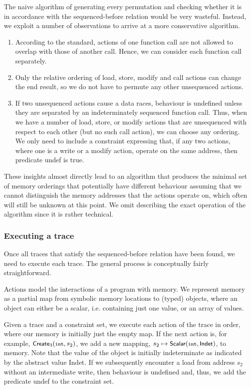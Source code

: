 \documentclass[a4paper,12pt]{scrbook}
\theoremstyle{plain}
\theoremstyle{definition}
\newcommand{\sem}[1]{{\small{\textsf{#1}}}}
\newcommand{\cc}[1]{{\text{\footnotesize\ttfamily{#1}}}}
\begin{document}
The naive algorithm of generating every permutation and checking whether it is
in accordance with the sequenced-before relation would be very
wasteful. Instead, we exploit a number of observations to arrive at a more
conservative algorithm.
\begin{enumerate}
\item According to the standard, actions of one function call are not allowed to
  overlap with those of another call. Hence, we can consider each function call
  separately.
\item Only the relative ordering of load, store, modify and call actions can
  change the end result, so we do not have to permute any other unsequenced
  actions.
\item If two unsequenced actions cause a data races, behaviour is undefined
  unless they are separated by an indeterminately sequenced function call. Thus,
  when we have a number of load, store, or modify actions that are unsequenced
  with respect to each other (but no such call action), we can choose any
  ordering. We only need to include a constraint expressing that, if any two
  actions, where one is a write or a modify action, operate on the same address,
  then predicate \sem{undef} is true.
\end{enumerate}
These insights almost directly lead to an algorithm that produces the minimal
set of memory orderings that potentially have different behaviour assuming that
we cannot distinguish the memory addresses that the actions operate on, which
often will still be unknown at this point. We omit describing the exact
operation of the algorithm since it is rather technical.

\subsubsection{Executing a trace}
Once all traces that satisfy the sequenced-before relation have been found, we
need to execute each trace. The general process is conceptually fairly
straightforward.

Actions model the interactions of a program with memory. We represent memory as
a partial map from symbolic memory locations to (typed) objects, where an object
can either be a scalar, i.e. containing just one value, or an array of values.

Given a trace and a constraint set, we execute each action of the trace in
order, where our memory is initially just the empty map. If the next action is,
for example, $\sem{Create}_{3}(\cc{int}, s_{2})$, we add a new mapping, $s_2
\mapsto \sem{Scalar}(\cc{int}, \sem{Indet})$, to memory. Note that the value of
the object is initially indeterminate as indicated by the abstract value
\sem{Indet}. If we subsequently encounter a load from address $s_2$ without an
intermediate write, then behaviour is undefined and, thus, we add the predicate
\sem{undef} to the constraint set.
\end{document}
